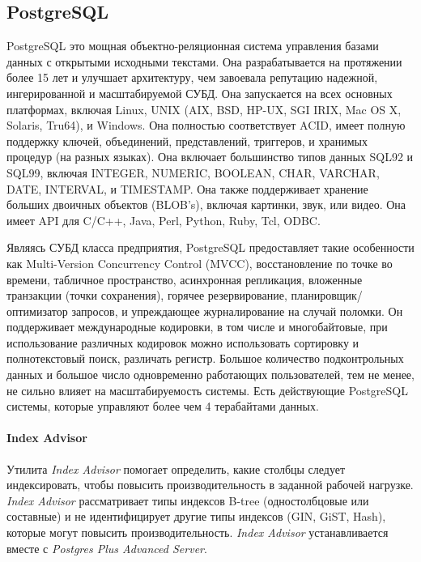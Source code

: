 \subsection{PostgreSQL}

PostgreSQL это мощная объектно-реляционная система управления базами данных с открытыми исходными текстами. Она разрабатывается на протяжении более 15 лет и улучшает архитектуру, чем завоевала репутацию надежной, ингерированной и масштабируемой СУБД. Она запускается на всех основных платформах, включая Linux, UNIX (AIX, BSD, HP-UX, SGI IRIX, Mac OS X, Solaris, Tru64), и Windows. Она полностью соответствует ACID, имеет полную поддержку ключей, объединений, представлений, триггеров, и хранимых процедур (на разных языках). Она включает большинство типов данных SQL92 и SQL99, включая INTEGER, NUMERIC, BOOLEAN, CHAR, VARCHAR, DATE, INTERVAL, и TIMESTAMP. Она также поддерживает хранение больших двоичных объектов (BLOB's), включая картинки, звук, или видео. Она имеет API для C/C++, Java, Perl, Python, Ruby, Tcl, ODBC. 

Являясь СУБД класса предприятия, PostgreSQL предоставляет такие особенности как Multi-Version Concurrency Control (MVCC), восстановление по точке во времени, табличное пространство, асинхронная репликация, вложенные транзакции (точки сохранения), горячее резервирование, планировщик/оптимизатор запросов, и упреждающее журналирование на случай поломки. Он поддерживает международные кодировки, в том числе и многобайтовые, при использование различных кодировок можно использовать сортировку и полнотекстовый поиск, различать регистр. Большое количество подконтрольных данных и большое число одновременно работающих пользователей, тем не менее, не сильно влияет на масштабируемость системы. Есть действующие PostgreSQL системы, которые управляют более чем 4 терабайтами данных. \cite{opensuse.org:Postgresql}

\paragraph{Index Advisor}

Утилита \textit{Index Advisor} помогает определить, какие столбцы следует индексировать, чтобы повысить производительность в заданной рабочей нагрузке. \textit{Index Advisor} рассматривает типы индексов B-tree (одностолбцовые или составные) и не идентифицирует другие типы индексов (GIN, GiST, Hash), которые могут повысить производительность. \textit{Index Advisor} устанавливается вместе с \textit{Postgres Plus Advanced Server}.

